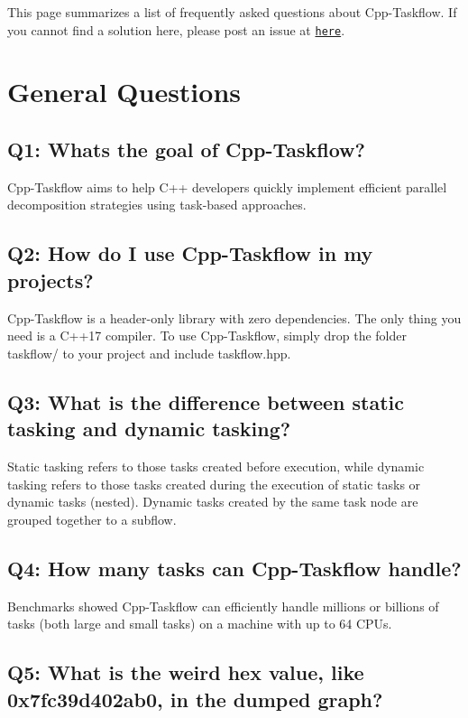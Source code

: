 This page summarizes a list of frequently asked questions about Cpp-\/\+Taskflow. If you cannot find a solution here, please post an issue at \href{https://github.com/cpp-taskflow/cpp-taskflow/issues}{\tt here}.\hypertarget{_f_a_q_GeneralQuestions}{}\section{General Questions}\label{_f_a_q_GeneralQuestions}
\hypertarget{_f_a_q_GeneralQuestion1}{}\subsection{Q1\+: What\textquotesingle{}s the goal of Cpp-\/\+Taskflow?}\label{_f_a_q_GeneralQuestion1}
Cpp-\/\+Taskflow aims to help C++ developers quickly implement efficient parallel decomposition strategies using task-\/based approaches.\hypertarget{_f_a_q_GeneralQuestion2}{}\subsection{Q2\+: How do I use Cpp-\/\+Taskflow in my projects?}\label{_f_a_q_GeneralQuestion2}
Cpp-\/\+Taskflow is a header-\/only library with zero dependencies. The only thing you need is a C++17 compiler. To use Cpp-\/\+Taskflow, simply drop the folder {\ttfamily taskflow/} to your project and include taskflow.\+hpp.\hypertarget{_f_a_q_GeneralQuestion3}{}\subsection{Q3\+: What is the difference between static tasking and dynamic tasking?}\label{_f_a_q_GeneralQuestion3}
Static tasking refers to those tasks created before execution, while dynamic tasking refers to those tasks created during the execution of static tasks or dynamic tasks (nested). Dynamic tasks created by the same task node are grouped together to a subflow.\hypertarget{_f_a_q_GeneralQuestion4}{}\subsection{Q4\+: How many tasks can Cpp-\/\+Taskflow handle?}\label{_f_a_q_GeneralQuestion4}
Benchmarks showed Cpp-\/\+Taskflow can efficiently handle millions or billions of tasks (both large and small tasks) on a machine with up to 64 C\+P\+Us.\hypertarget{_f_a_q_GeneralQuestion5}{}\subsection{Q5\+: What is the weird hex value, like 0x7fc39d402ab0, in the dumped graph?}\label{_f_a_q_GeneralQuestion5}
